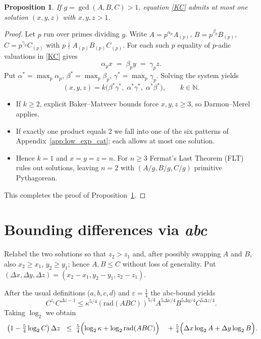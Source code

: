 \documentclass{article}
\newcommand{\N}{\mathbb N}
\newcommand{\rad}{\mathrm{rad}}
\newtheorem{proposition}[theorem]{Proposition}
\begin{document}
\begin{proposition}\label{prop:g}
If $g = \gcd(A,B,C) > 1$, equation \textup{\eqref{KC}} admits at most one solution $(x,y,z)$ with $x,y,z > 1$.
\end{proposition}
\begin{proof}
Let $p$ run over primes dividing $g$. Write
$A=p^{\alpha_p}A_{(p)}$, $B=p^{\beta_p}B_{(p)}$, $C=p^{\gamma_p}C_{(p)}$
with $p\nmid A_{(p)}B_{(p)}C_{(p)}$.
For each such $p$ equality of $p$-adic valuations in \eqref{KC} gives
\[
\alpha_p x \;=\; \beta_p y \;=\; \gamma_p z.
\]
Put $\alpha^{*}=\max_p\alpha_p$, $\beta^{*}=\max_p\beta_p$,
$\gamma^{*}=\max_p\gamma_p$. Solving the system yields
\[
(x,y,z)=k\bigl(\beta^{*}\gamma^{*},\; \alpha^{*}\gamma^{*},\; \alpha^{*}\beta^{*}\bigr),
\qquad k\in\N.
\]
\begin{itemize}
\item
If $k\ge2$, explicit Baker–Matveev bounds \cite{Matveev00} force $x,y,z\ge3$,
so Darmon–Merel \cite{DarmonMerel97} applies.
\item
If exactly one product equals 2 we fall into one of the six patterns of
Appendix~\ref{app:low_exp_cat}; each allows at most one solution.
\item
Hence $k=1$ and $x=y=z=n$. For $n\ge3$ Fermat’s Last Theorem (FLT)~\cite{Wiles95,TaylorWiles95} rules out
solutions, leaving $n=2$ with $(A/g,B/g,C/g)$ primitive Pythagorean.
\end{itemize}
This completes the proof of Proposition~\ref{prop:g}.
\end{proof}

\section{Bounding differences via \textit{abc}}\label{sec:abc}

Relabel the two solutions so that $z_{2}>z_{1}$ and, after possibly
swapping $A$ and $B$, also $x_{2}\ge x_{1}$, $y_{2}\ge y_{1}$; hence
$A,B\le C$ without loss of generality.
Put $(\Delta x,\Delta y,\Delta z)=(x_{2}-x_{1},y_{2}-y_{1},z_{2}-z_{1})$.

After the usual definitions ($a,b,c,d$) and $\varepsilon=\tfrac14$ the
abc-bound yields
\begin{equation}\label{eq:ineq}
  C^{z_{1}}C^{\Delta z-1}
  \le \kappa^{5/4}(\rad(ABC))^{5/4}
      A^{5\Delta x/4}B^{5\Delta y/4}C^{5\Delta z/4}.
\end{equation}
Taking $\log_{2}$ we obtain
\begin{equation}\label{eq:coef}
  \bigl(1-\tfrac54\log_{2} C\bigr)\,\Delta z\;
  \le\;\tfrac54\Bigl(\log_{2}\kappa+\log_{2}\rad(ABC)\Bigr)
      +\tfrac54\Bigl(\Delta x\log_{2} A+\Delta y\log_{2} B\Bigr).
\end{equation}
\end{document}
